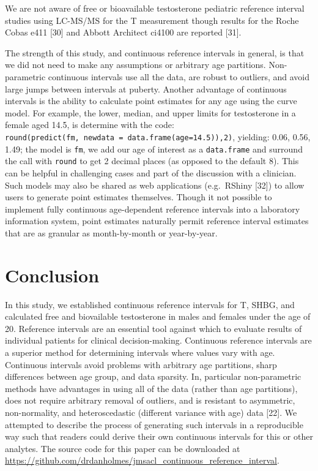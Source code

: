 \documentclass[]{elsarticle} %
\begin{document}
We are not aware of free or bioavailable testosterone pediatric
reference interval studies using LC-MS/MS for the T measurement though
results for the Roche Cobas e411 {[}30{]} and Abbott Architect ci4100
are reported {[}31{]}.

The strength of this study, and continuous reference intervals in
general, is that we did not need to make any assumptions or arbitrary
age partitions. Non-parametric continuous intervals use all the data,
are robust to outliers, and avoid large jumps between intervals at
puberty. Another advantage of continuous intervals is the ability to
calculate point estimates for any age using the curve model. For
example, the lower, median, and upper limits for testosterone in a
female aged 14.5, is determine with the code:
\texttt{round(predict(fm,\ newdata\ =\ data.frame(age=14.5)),2)},
yielding: 0.06, 0.56, 1.49; the model is \texttt{fm}, we add our age of
interest as a \texttt{data.frame} and surround the call with
\texttt{round} to get 2 decimal places (as opposed to the default 8).
This can be helpful in challenging cases and part of the discussion with
a clinician. Such models may also be shared as web applications
(e.g.~RShiny {[}32{]}) to allow users to generate point estimates
themselves. Though it not possible to implement fully continuous
age-dependent reference intervals into a laboratory information system,
point estimates naturally permit reference interval estimates that are
as granular as month-by-month or year-by-year.

\hypertarget{conclusion}{%
\section{Conclusion}\label{conclusion}}

In this study, we established continuous reference intervals for T,
SHBG, and calculated free and biovailable testosterone in males and
females under the age of 20. Reference intervals are an essential tool
against which to evaluate results of individual patients for clinical
decision-making. Continuous reference intervals are a superior method
for determining intervals where values vary with age. Continuous
intervals avoid problems with arbitrary age partitions, sharp
differences between age group, and data sparsity. In, particular
non-parametric methods have advantages in using all of the data (rather
than age partitions), does not require arbitrary removal of outliers,
and is resistant to asymmetric, non-normality, and heteroscedastic
(different variance with age) data {[}22{]}. We attempted to describe
the process of generating such intervals in a reproducible way such that
readers could derive their own continuous intervals for this or other
analytes. The source code for this paper can be downloaded at
\url{https://github.com/drdanholmes/jmsacl_continuous_reference_interval}.
\end{document}
